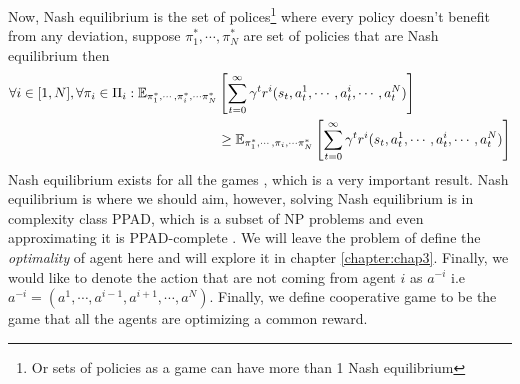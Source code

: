 Now, Nash equilibrium is the set of polices\footnote{Or sets of policies as a game can have more than 1 Nash equilibrium} where every policy doesn't benefit from any deviation, suppose $\pi_1^*, \cdots, \pi_N^*$ are set of policies that are Nash equilibrium then
\begin{equation}
\begin{aligned}
    \forall i \in [1, N], \forall \pi_i \in \Pi_i : \mathbb{E}_{\pi_1^*, \cdots, \pi_i^*, \cdots \pi_N^*} &\left[ \sum^\infty_{t=0} \gamma^t  r^i(s_t, a^1_t, \cdots, a^i_t, \cdots, a^{N}_t)  \right] \\
    &\ge \mathbb{E}_{\pi_1^*, \cdots, \pi_i, \cdots \pi_N^*} \left[ \sum^\infty_{t=0} \gamma^t  r^i(s_t, a^1_t, \cdots, a^i_t, \cdots, a^{N}_t)  \right]
\end{aligned}
\end{equation}
Nash equilibrium exists for all the games \cite{nash1950equilibrium}, which is a very important result. Nash equilibrium is where we should aim, however, solving Nash equilibrium is in complexity class PPAD, which is a subset of NP problems \cite{daskalakis2009complexity} and even approximating it is PPAD-complete \cite{daskalakis2013complexity}. We will leave the problem of define the \textit{optimality} of agent here and will explore it in chapter \ref{chapter:chap3}. Finally, we would like to denote the action that are not coming from agent $i$ as $a^{-i}$ i.e $a^{-i} = (a^1, \cdots, a^{i-1}, a^{i+1}, \cdots, a^N)$. Finally, we define cooperative game to be the game that all the agents are optimizing a common reward.

